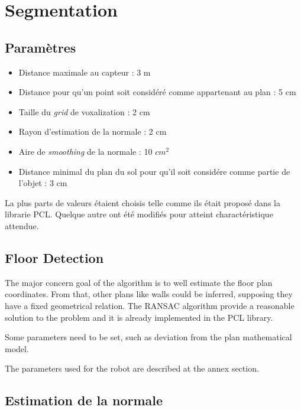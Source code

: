 \section{ Segmentation }
\label{annexe:segmentation}

 
\subsection{ Paramètres }

\begin{itemize}
\item Distance maximale au capteur : 3 m
\item Distance pour qu'un point soit considéré comme appartenant au plan : 5 cm
\item Taille du \textit{grid} de voxalization : 2 cm
\item Rayon d'estimation de la normale : 2 cm
\item Aire de \textit{smoothing} de la normale : 10 $cm^2$
\item Distance minimal du plan du sol pour qu'il soit considére comme partie de l'objet : 3 cm
\end{itemize}

La plus parts de valeurs étaient choisis telle comme ils était proposé dans la librarie PCL. Quelque autre ont été modifiés pour atteint charactéristique attendue.

\subsection { Floor Detection } 

The major concern goal of the algorithm is to well estimate the floor plan coordinates. From that, other plans like walls could be inferred, supposing they have a fixed geometrical relation. The RANSAC algorithm provide a reasonable solution to the problem and it is already implemented in the PCL library.

Some parameters need to be set, such as deviation from the plan mathematical model.

The parameters used for the robot are described at the annex section.


\subsection{Estimation de la normale}

